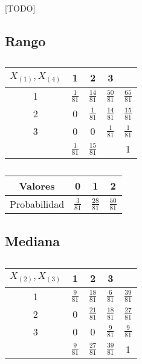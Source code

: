\documentclass{article}
\begin{document}
    \paragraph{}
    [TODO]

    \subsection{Rango}


    \begin{table}[H]
      \centering
      \begin{tabular}{c | c  c  c | c}
        $X_{(1)},X_{(4)}$ & 1               & 2               & 3               &                 \\ \hline
        1                 & $\frac{1}{81}$  & $\frac{14}{81}$ & $\frac{50}{81}$ & $\frac{65}{81}$ \\
        2                 & 0               & $\frac{1}{81}$  & $\frac{14}{81}$ & $\frac{15}{81}$ \\
        3                 & 0               & 0               & $\frac{1}{81}$  & $\frac{1}{81}$  \\ \hline
                          &  $\frac{1}{81}$ & $\frac{15}{81}$ &                 & 1
      \end{tabular}
      \caption{}
      \label{}
    \end{table}

    \begin{table}[H]
      \centering
      \begin{tabular}{ c | c c c |}
        Valores       & 0             & 1             & 2 \\ \hline
        Probabilidad  & $\frac{3}{81}$  & $\frac{28}{81}$ & $\frac{50}{81}$
      \end{tabular}
      \caption{}
      \label{}

    \end{table}

    \subsection{Mediana}


    \begin{table}[H]
      \centering
      \begin{tabular}{c | c  c  c | c}
        $X_{(2)},X_{(3)}$ & 1               & 2               & 3               &                 \\ \hline
        1                 & $\frac{9}{81}$  & $\frac{18}{81}$ & $\frac{6}{81}$  &$\frac{39}{81}$  \\
        2                 & 0               & $\frac{21}{81}$ & $\frac{18}{81}$ & $\frac{27}{81}$ \\
        3                 & 0               & 0               & $\frac{9}{81}$  & $\frac{9}{81}$  \\ \hline
                          & $\frac{9}{81}$  & $\frac{27}{81}$ & $\frac{39}{81}$ & 1
      \end{tabular}
      \caption{}
      \label{}
    \end{table}
\end{document}
